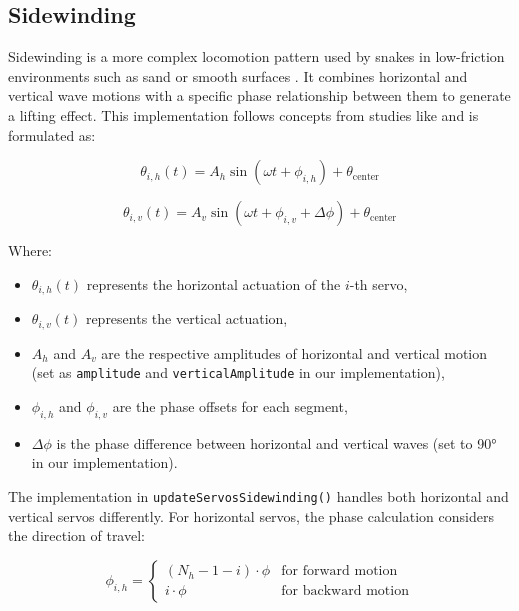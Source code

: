 \documentclass[12pt,a4paper]{report}
\begin{document}
\FloatBarrier
\subsection{Sidewinding}
Sidewinding is a more complex locomotion pattern used by snakes in low-friction environments such as sand or smooth surfaces \cite{transeth-2009}. It combines horizontal and vertical wave motions with a specific phase relationship between them to generate a lifting effect. This implementation follows concepts from studies like \textcite{yamano-2023} and is formulated as:

\begin{equation}
\theta_{i,h}(t) = A_h \sin(\omega t + \phi_{i,h}) + \theta_{\text{center}}
\end{equation}

\begin{equation}
\theta_{i,v}(t) = A_v \sin(\omega t + \phi_{i,v} + \Delta\phi) + \theta_{\text{center}}
\end{equation}

Where:
\begin{itemize}
    \item $\theta_{i,h}(t)$ represents the horizontal actuation of the $i$-th servo,
    \item $\theta_{i,v}(t)$ represents the vertical actuation,
    \item $A_h$ and $A_v$ are the respective amplitudes of horizontal and vertical motion (set as \texttt{amplitude} and \texttt{verticalAmplitude} in our implementation),
    \item $\phi_{i,h}$ and $\phi_{i,v}$ are the phase offsets for each segment,
    \item $\Delta\phi$ is the phase difference between horizontal and vertical waves (set to 90° in our implementation).
\end{itemize}

The implementation in \texttt{updateServosSidewinding()} handles both horizontal and vertical servos differently. For horizontal servos, the phase calculation considers the direction of travel:

\begin{equation}
\phi_{i,h} = 
\begin{cases}
(N_h - 1 - i) \cdot \phi & \text{for forward motion} \\
i \cdot \phi & \text{for backward motion}
\end{cases}
\end{equation}
\end{document}
